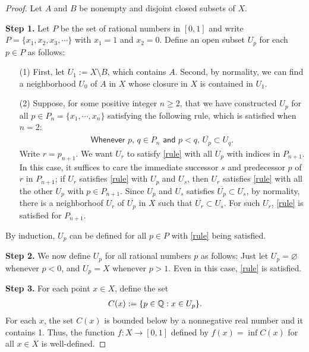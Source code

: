 \begin{proof}
    Let $A$ and $B$ be nonempty and disjoint closed subsets of $X$.

    \textbf{Step 1.}
    Let $P$ be the set of rational numbers in $[0, 1]$ and write $P=\{x_1, x_2, x_3, \cdots\}$ with $x_1=1$ and $x_2=0$.
    Define an open subset $U_p$ for each $p\in P$ as follows:
    \begin{enumerate}
        \item[(1)]
        {
            First, let $U_1:=X\setminus B$, which contains $A$.
            Second, by normality, we can find a neighborhood $U_0$ of $A$ in $X$ whose closure in $X$ is contained in $U_1$.
        }
        \item[(2)]
        {
            Suppose, for some positive integer $n\geq 2$, that we have constructed $U_p$ for all $p\in P_n=\{x_1, \cdots, x_n\}$ satisfying the following rule, which is satisfied when $n=2$:
            \begin{align}\label{rule}
                \textsf{Whenever $p,\,q\in P_n$ and $p<q$, $\overline{U_p}\subset U_q$}.
            \end{align}
            Write $r=p_{n+1}$.
            We want $U_r$ to satisfy \cref{rule} with all $U_p$ with indices in $P_{n+1}$.
            In this case, it suffices to care the immediate successor $s$ and predecessor $p$ of $r$ in $P_{n+1}$; if $U_r$ satisfies \cref{rule} with $U_p$ and $U_s$, then $U_r$ satisfies \cref{rule} with all the other $U_p$ with $p\in P_{n+1}$.
            Since $U_p$ and $U_s$ satisfies $\overline{U_p}\subset U_s$, by normality, there is a neighborhoof $U_r$ of $\overline{U_p}$ in $X$ such that $\overline{U_r}\subset U_s$.
            For such $U_r$, \cref{rule} is satisfied for $P_{n+1}$.
        }
    \end{enumerate}
    By induction, $U_p$ can be defined for all $p\in P$ with \cref{rule} being satisfied.

    \textbf{Step 2.}
    We now define $U_p$ for all rational numbers $p$ as follows: Just let $U_p=\varnothing$ whenever $p<0$, and $U_p=X$ whenever $p>1$.
    Even in this case, \cref{rule} is satisfied.
    
    \textbf{Step 3.}
    For each point $x\in X$, define the set
    \begin{align*}
        C(x):=\{p\in{\mathbb{Q}}:x\in U_p\}.
    \end{align*}
    For each $x$, the set $C(x)$ is bounded below by a nonnegative real number and it contains 1.
    Thus, the function $f: X\rightarrow[0, 1]$ defined by $f(x)=\inf C(x)$ for all $x\in X$ is well-defined.


\end{proof}
